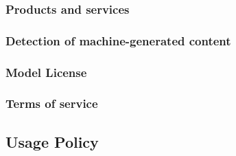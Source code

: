 \documentclass{article}
\begin{document}
\subsubsection{Products and services}


\subsubsection{Detection of machine-generated content}


\subsubsection{Model License}


\subsubsection{Terms of service}


\subsection{Usage Policy}
\end{document}
